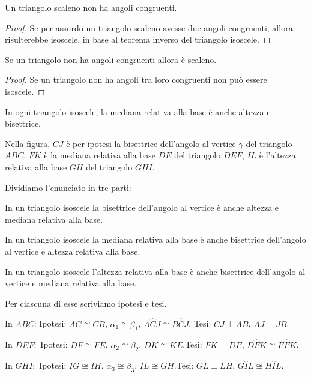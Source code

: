 \begin{corollario}
Un triangolo scaleno non ha angoli congruenti.
\end{corollario}

\begin{proof}
Se per assurdo un triangolo scaleno avesse due angoli congruenti, allora risulterebbe isoscele, in base al teorema inverso del triangolo isoscele.
\end{proof}

\begin{corollario}
Se un triangolo non ha angoli congruenti allora è scaleno.
\end{corollario}

\begin{proof}
Se un triangolo non ha angoli tra loro congruenti non può essere isoscele.
\end{proof}

\begin{proposizione}
In ogni triangolo isoscele, la mediana relativa alla base è anche altezza e bisettrice.
\end{proposizione}
Nella figura, $CJ$ è per ipotesi la bisettrice dell'angolo al vertice $\gamma$ del triangolo $ABC$, $FK$ è la mediana relativa alla base $DE$ del triangolo $DEF$, $IL$ è l'altezza relativa alla base $GH$ del triangolo $GHI$.

\begin{figure}[htb]
\centering
\end{figure}

Dividiamo l'enunciato in tre parti:
\begin{enumeratea}
\item In un triangolo isoscele la bisettrice dell'angolo al vertice è anche altezza e mediana relativa alla base.
\item In un triangolo isoscele la mediana relativa alla base è anche bisettrice dell'angolo al vertice e altezza relativa alla base.
\item In un triangolo isoscele l'altezza relativa alla base è anche bisettrice dell'angolo al vertice e mediana relativa alla base.
\end{enumeratea}

Per ciascuna di esse scriviamo ipotesi e tesi.
\begin{enumeratea}
\item In $ABC$:	Ipotesi: $AC\cong CB$, $\alpha_1\cong \beta_1$, $A\widehat{C}J\cong B\widehat{C}J$. Tesi: $CJ\perp AB$, $AJ\perp JB$.
\item In $DEF$:	\,Ipotesi: $DF\cong FE$, $\alpha_2\cong \beta_2$, $DK\cong KE$.\tab Tesi: $FK\perp DE$, $D\widehat{F}K\cong E\widehat{F}K$.
\item In $GHI$:	\,Ipotesi: $IG\cong IH$, $\alpha_3\cong \beta_3$, $IL\cong GH$.\tab Tesi: $GL\perp LH$, $G\widehat{I}L\cong H\widehat{I}L$.
\end{enumeratea}

